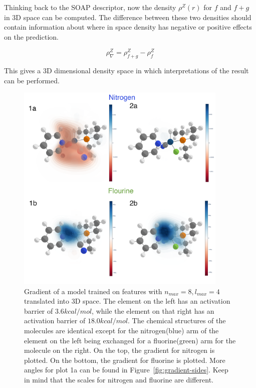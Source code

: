 Thinking back to the SOAP descriptor, now the density $\rho^Z(r)$ for $f$ and $f + g$ in 3D space can be computed.
The difference between these two densities should contain information about where in space density has negative or positive effects on the prediction.

$$ \rho^Z_\nabla = \rho^Z_{f+g} -  \rho^Z_{f} $$

This gives a 3D dimensional density space in which interpretations of the result can be performed.
\begin{figure}
  \centering
  \includegraphics[width=0.9\textwidth]{figures/evaluation/GradientComp.png}
  \caption[Comparison of local gradients]{
      Gradient of a model trained on features with $n_{max}=8, l_{max}=4$ translated into 3D space.
      The element on the left has an activation barrier of $3.6 kcal/mol$, while the element on that right
      has an activation barrier of $18.0 kcal/mol$.
      The chemical structures of the molecules are identical except for the nitrogen(blue) arm of the element
      on the left being exchanged for a fluorine(green) arm for the molecule on the right.
      On the top, the gradient for nitrogen is plotted. On the bottom, the gradient for fluorine is plotted.
      More angles for plot 1a can be found in Figure~\ref{fig:gradient-sides}.
      Keep in mind that the scales for nitrogen and fluorine are different.
   }
  \label{fig:snap-gradient}
\end{figure}


